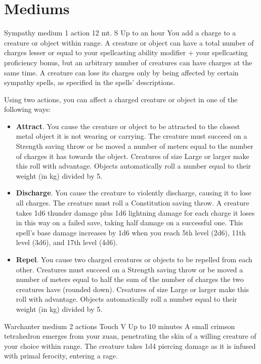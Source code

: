 \section{Mediums} \label{sec::mediums}
    {Sympathy medium}
    {1 action}
    {12 mt.}
    {S}
    {Up to an hour}
    You add a charge to a creature or object within range.
    A creature or object can have a total number of charges lesser or equal to your spellcasting ability modifier + your spellcasting proficiency bonus, but an arbitrary number of creatures can have charges at the same time.
    A creature can lose its charges only by being affected by certain sympathy spells, as specified in the spells' descriptions.

    Using two actions, you can affect a charged creature or object in one of the following ways:
    \begin{itemize}
        \item \textbf{Attract}.
        You cause the creature or object to be attracted to the closest metal object it is not wearing or carrying.
        The creature must succeed on a Strength saving throw or be moved a number of meters equal to the number of charges it has towards the object.
        Creatures of size Large or larger make this roll with advantage.
        Objects automatically roll a number equal to their weight (in kg) divided by 5.
        \item \textbf{Discharge}.
        You cause the creature to violently discharge, causing it to lose all charges.
        The creature must roll a Constitution saving throw.
        A creature takes 1d6 thunder damage plus 1d6 lightning damage for each charge it loses in this way on a failed save, taking half damage on a successful one.
        This spell's base damage increases by 1d6 when you reach 5th level (2d6), 11th level (3d6), and 17th level (4d6).
        \item \textbf{Repel}.
        You cause two charged creatures or objects to be repelled from each other.
        Creatures must succeed on a Strength saving throw or be moved a number of meters equal to half the sum of the number of charges the two creatures have (rounded down).
        Creatures of size Large or larger make this roll with advantage.
        Objects automatically roll a number equal to their weight (in kg) divided by 5.
    \end{itemize}
    {Warchanter medium}
    {2 actions}
    {Touch}
    {V}
    {Up to 10 minutes}
    A small crimson tetrahedron emerges from your zuan, penetrating the skin of a willing creature of your choice within range.
    The creature takes 1d4 piercing damage as it is infused with primal ferocity, entering a rage.

